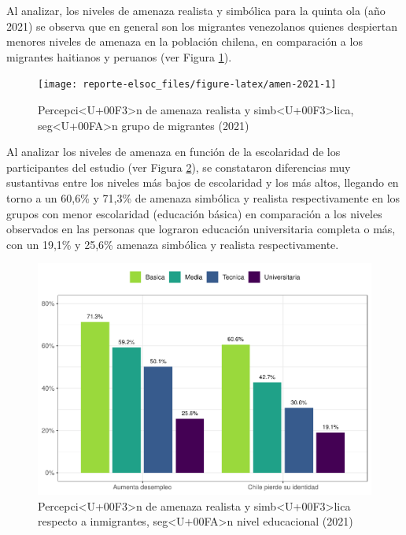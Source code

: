 \documentclass[
  12pt,
]{book}
\begin{document}
Al analizar, los niveles de amenaza realista y simbólica para la quinta ola (año 2021) se observa que en general son los migrantes venezolanos quienes despiertan menores niveles de amenaza en la población chilena, en comparación a los migrantes haitianos y peruanos (ver Figura \ref{fig:amen-2021}).

\begin{figure}

{\centering \texttt{[image: reporte-elsoc\_files/figure-latex/amen-2021-1]} 

}

\caption{Percepci<U+00F3>n de amenaza realista y simb<U+00F3>lica, seg<U+00FA>n grupo de migrantes (2021)}\label{fig:amen-2021}
\end{figure}

Al analizar los niveles de amenaza en función de la escolaridad de los participantes del estudio (ver Figura \ref{fig:amen-educ}), se constataron diferencias muy sustantivas entre los niveles más bajos de escolaridad y los más altos, llegando en torno a un 60,6\% y 71,3\% de amenaza simbólica y realista respectivamente en los grupos con menor escolaridad (educación básica) en comparación a los niveles observados en las personas que lograron educación universitaria completa o más, con un 19,1\% y 25,6\% amenaza simbólica y realista respectivamente.

\begin{figure}

{\centering \includegraphics{reporte-elsoc_files/figure-latex/amen-educ-1} 

}

\caption{Percepci<U+00F3>n de amenaza realista y simb<U+00F3>lica respecto a inmigrantes, seg<U+00FA>n nivel educacional (2021)}\label{fig:amen-educ}
\end{figure}
\end{document}

